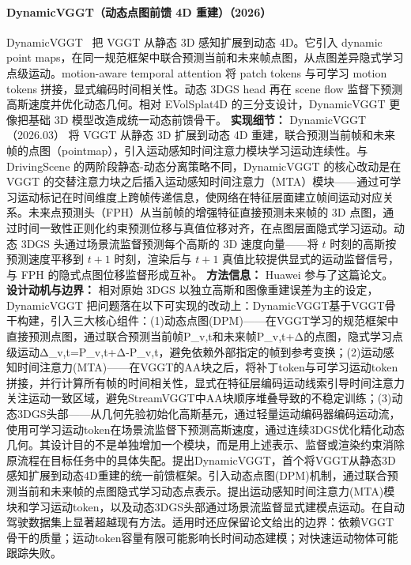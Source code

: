 \paragraph{DynamicVGGT（动态点图前馈 4D 重建）（2026）}
DynamicVGGT~\cite{2603_08254} 把 VGGT 从静态 3D 感知扩展到动态 4D。它引入 dynamic point maps，在同一规范框架中联合预测当前和未来帧点图，从点图差异隐式学习点级运动。motion-aware temporal attention 将 patch tokens 与可学习 motion tokens 拼接，显式编码时间相关性。动态 3DGS head 再在 scene flow 监督下预测高斯速度并优化动态几何。相对 EVolSplat4D 的三分支设计，DynamicVGGT 更像把基础 3D 模型改造成统一动态前馈骨干。
\textbf{实现细节：} DynamicVGGT（2026.03） 将 VGGT 从静态 3D 扩展到动态 4D 重建，联合预测当前帧和未来帧的点图（pointmap），引入运动感知时间注意力模块学习运动连续性。与 DrivingScene 的两阶段静态-动态分离策略不同，DynamicVGGT 的核心改动是在 VGGT 的交替注意力块之后插入运动感知时间注意力（MTA）模块——通过可学习运动标记在时间维度上跨帧传递信息，使网络在特征层面建立帧间运动对应关系。未来点预测头（FPH）从当前帧的增强特征直接预测未来帧的 3D 点图，通过时间一致性正则化约束预测位移与真值位移对齐，在点图层面隐式学习运动。动态 3DGS 头通过场景流监督预测每个高斯的 3D 速度向量——将 $t$ 时刻的高斯按预测速度平移到 $t+1$ 时刻，渲染后与 $t+1$ 真值比较提供显式的运动监督信号，与 FPH 的隐式点图位移监督形成互补。
\textbf{方法信息：} Huawei 参与了这篇论文。
\textbf{设计动机与边界：} 相对原始 3DGS 以独立高斯和图像重建误差为主的设定，DynamicVGGT 把问题落在以下可实现的改动上：DynamicVGGT基于VGGT骨干构建，引入三大核心组件：(1)动态点图(DPM)——在VGGT学习的规范框架中直接预测点图，通过联合预测当前帧P\_{v,t}和未来帧P\_{v,t+Δ}的点图，隐式学习点级运动Δ\_{v,t}=P\_{v,t+Δ}-P\_{v,t}，避免依赖外部指定的帧到参考变换；(2)运动感知时间注意力(MTA)——在VGGT的AA块之后，将补丁token与可学习运动token拼接，并行计算所有帧的时间相关性，显式在特征层编码运动线索引导时间注意力关注运动一致区域，避免StreamVGGT中AA块顺序堆叠导致的不稳定训练；(3)动态3DGS头部——从几何先验初始化高斯基元，通过轻量运动编码器编码运动流，使用可学习运动token在场景流监督下预测高斯速度，通过连续3DGS优化精化动态几何。其设计目的不是单独增加一个模块，而是用上述表示、监督或渲染约束消除原流程在目标任务中的具体失配。提出DynamicVGGT，首个将VGGT从静态3D感知扩展到动态4D重建的统一前馈框架。引入动态点图(DPM)机制，通过联合预测当前和未来帧的点图隐式学习动态点表示。提出运动感知时间注意力(MTA)模块和学习运动token，以及动态3DGS头部通过场景流监督显式建模点运动。在自动驾驶数据集上显著超越现有方法。适用时还应保留论文给出的边界：依赖VGGT骨干的质量；运动token容量有限可能影响长时间动态建模；对快速运动物体可能跟踪失败。

